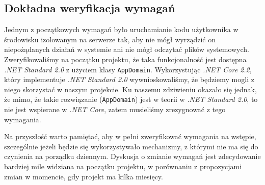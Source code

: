 \documentclass[a4paper,11pt,twoside]{report}
\theoremstyle{definition}
\begin{document}
        \subsection{Dokładna weryfikacja wymagań}
            Jednym z początkowych wymagań było uruchamianie kodu użytkownika w środowisku izolowanym na serwerze tak, aby nie mógł wyrządzić on niepożądanych działań w systemie ani nie mógł odczytać plików systemowych.
            Zweryfikowaliśmy na początku projektu, że taka funkcjonalność jest dostępna {\textit{.NET Standard 2.0}} z użyciem klasy {\texttt{AppDomain}}. Wykorzystując {\textit{.NET Core 2.2}}, który implementuje {\textit{.NET Standard 2.0}} wywnioskowaliśmy, że będziemy mogli z niego skorzystać w naszym projekcie.
            Ku naszemu zdziwieniu okazało się jednak, że mimo, że takie rozwiązanie ({\texttt{AppDomain}}) jest w teorii w {\textit{.NET Standard 2.0}}, to nie jest wspierane w {\textit{.NET Core}}, zatem musieliśmy zrezygnować z tego wymagania.
            
            Na przyszłość warto pamiętać, aby w pełni zweryfikować wymagania na wstępie, szczególnie jeżeli będzie się wykorzystywało mechanizmy, z którymi nie ma się do czynienia na porządku dziennym. Dyskusja o zmianie wymagań jest zdecydowanie bardziej mile widziana na początku projektu, w porównaniu z propozycjami zmian w momencie, gdy projekt ma kilka miesięcy.
        


\end{document}
